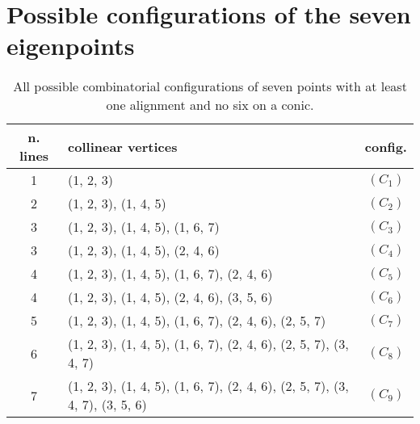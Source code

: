 \documentclass[a4paper, 11pt, reqno]{amsart}
\theoremstyle{plain}
\theoremstyle{definition}
\begin{document}
\section{Possible configurations of the seven eigenpoints}
\label{further_alignments}

\begin{table}[ht]
\caption{All possible combinatorial configurations of seven points with at least one alignment and no six on a conic.}
\centering
\begin{tabular}{|clc|}\hline
  n. lines & collinear vertices & config.\\ \hline
 1& (1, 2, 3) &  $(C_1)$\\
 2& (1, 2, 3), (1, 4, 5) &  $(C_2)$\\
 3& (1, 2, 3), (1, 4, 5), (1, 6, 7) & $(C_3)$\\
 3& (1, 2, 3), (1, 4, 5), (2, 4, 6) & $(C_4)$\\
 4& (1, 2, 3), (1, 4, 5), (1, 6, 7), (2, 4, 6) & $(C_5)$\\
 4& (1, 2, 3), (1, 4, 5), (2, 4, 6), (3, 5, 6) & $(C_6)$\\
 5& (1, 2, 3), (1, 4, 5), (1, 6, 7), (2, 4, 6), (2, 5, 7)& $(C_7)$\\
 6& (1, 2, 3), (1, 4, 5), (1, 6, 7), (2, 4, 6), (2, 5, 7), (3, 4, 7)& $(C_8)$\\
 7& (1, 2, 3), (1, 4, 5), (1, 6, 7), (2, 4, 6), (2, 5, 7), (3, 4, 7), (3, 5, 6) &  $(C_9)$\\ \hline
\end{tabular}
\label{table:all_alignments}
\end{table}
%
\end{document}
